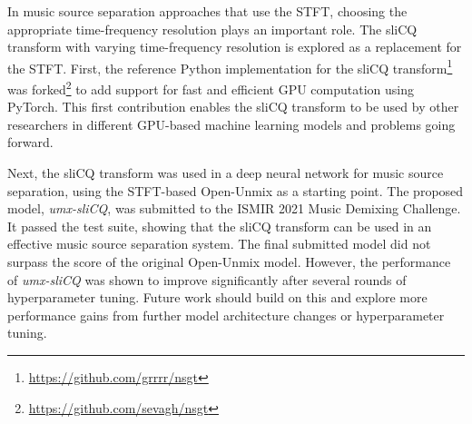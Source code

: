 \documentclass[letter,12pt]{article}
\begin{document}
In music source separation approaches that use the STFT, choosing the appropriate time-frequency resolution plays an important role. The sliCQ transform with varying time-frequency resolution is explored as a replacement for the STFT. First, the reference Python implementation for the sliCQ transform\footnote{\url{https://github.com/grrrr/nsgt}} was forked\footnote{\url{https://github.com/sevagh/nsgt}} to add support for fast and efficient GPU computation using PyTorch. This first contribution enables the sliCQ transform to be used by other researchers in different GPU-based machine learning models and problems going forward.

Next, the sliCQ transform was used in a deep neural network for music source separation, using the STFT-based Open-Unmix as a starting point. The proposed model, \textit{umx-sliCQ}, was submitted to the ISMIR 2021 Music Demixing Challenge. It passed the test suite, showing that the sliCQ transform can be used in an effective music source separation system. The final submitted model did not surpass the score of the original Open-Unmix model. However, the performance of \textit{umx-sliCQ} was shown to improve significantly after several rounds of hyperparameter tuning. Future work should build on this and explore more performance gains from further model architecture changes or hyperparameter tuning.

\vfill
\clearpage %

\printbibheading[title={References},heading=bibnumbered]
\printbibliography[heading=none]

\vfill
\clearpage %
\end{document}
